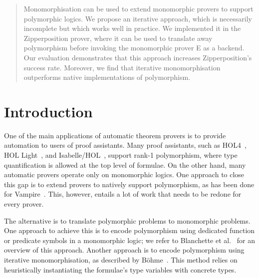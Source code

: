 \documentclass[runningheads]{llncs}
\begin{document}
\author{Tanguy Bozec \and
Jasmin Blanchette}




\maketitle

\begin{sloppy}
\begin{abstract}
Monomorphisation can be used to extend monomorphic provers to support polymorphic logics. We propose an iterative approach, which is necessarily incomplete but which works well in practice. We implemented it in the Zipperposition prover, where it can be used to translate away polymorphism before invoking the monomorphic prover E as a backend. Our evaluation demonstrates that this approach increases Zipperposition's success rate. Moreover, we find that iterative monomorphisation outperforms native implementations of polymorphism.

\end{abstract}
\end{sloppy}

\section{Introduction}

One of the main applications of automatic theorem provers is to provide automation to users of proof assistants. Many proof assistants, such as HOL4~\cite{slind-norrish-2008}, HOL Light~\cite{harrison-2009}, and
Isabelle/HOL~\cite{nipkow-et-al-2002}, support rank-1 polymorphism, where type quantification is allowed at the top level of formulae. On the other hand, many automatic provers operate only on monomorphic logics. One approach to close this gap is to extend provers to natively support polymorphism, as has been done for Vampire~\cite{bhayat-reger-2020}. This, however, entails a lot of work that needs to be redone for every prover.

The alternative is to translate polymorphic problems to monomorphic problems.
One approach to achieve this is to encode polymorphism using dedicated function or predicate symbols in a monomorphic logic;
we refer to Blanchette et al.~\cite[Section~9]{mono-trans} for an overview of this approach.
Another approach is to encode polymorphism using {iterative monomorphisation}, as described by B\"ohme~\cite[Section 2.2.1]{sb-phd}. This method relies on heuristically instantiating the formulae's type variables with concrete types.
\end{document}
